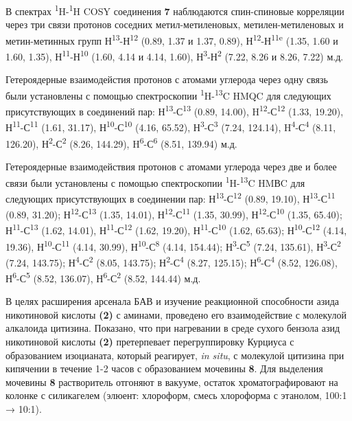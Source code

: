 \begin{multicols}{2}
В спектрах \textsuperscript{1}H-\textsuperscript{1}H COSY соединения
{\bfseries 7} наблюдаются спин-спиновые корреляции через три связи протонов
соседних метил-метиленовых, метилен-метиленовых и метин-метинных групп
Н\textsuperscript{13}-Н\textsuperscript{12} (0.89, 1.37 и 1.37, 0.89),
Н\textsuperscript{12}-Н\textsuperscript{11e} (1.35, 1.60 и 1.60, 1.35),
Н\textsuperscript{11}-Н\textsuperscript{10} (1.60, 4.14 и 4.14, 1.60),
Н\textsuperscript{3}-Н\textsuperscript{2} (7.22, 8.26 и 8.26, 7.22) м.д.

Гетероядерные взаимодейстия протонов с атомами углерода через одну связь
были установлены с помощью спектроскопии
\textsuperscript{1}H-\textsuperscript{13}C HMQC для следующих
присутствующих в соединений пар:
Н\textsuperscript{13}-С\textsuperscript{13} (0.89, 14.00),
H\textsuperscript{12}-С\textsuperscript{12} (1.33, 19.20),
Н\textsuperscript{11}-С\textsuperscript{11} (1.61, 31.17),
Н\textsuperscript{10}-С\textsuperscript{10} (4.16, 65.52),
Н\textsuperscript{3}-С\textsuperscript{3} (7.24, 124.14),
H\textsuperscript{4}-С\textsuperscript{4} (8.11, 126.20),
Н\textsuperscript{2}-С\textsuperscript{2} (8.26, 144.29),
H\textsuperscript{6}-С\textsuperscript{6} (8.51, 139.94) м.д.

Гетероядерные взаимодействия протонов с атомами углерода через две и
более связи были установлены с помощью спектроскопии
\textsuperscript{1}H-\textsuperscript{13}C HMВC для следующих
присутствующих в соединении пар:
Н\textsuperscript{13}-С\textsuperscript{12} (0.89, 19.10),
Н\textsuperscript{13}-С\textsuperscript{11} (0.89, 31.20);
Н\textsuperscript{12}-С\textsuperscript{13} (1.35, 14.01),
Н\textsuperscript{12}-С\textsuperscript{11} (1.35, 30.99),
Н\textsuperscript{12}-С\textsuperscript{10} (1.35, 65.40);
Н\textsuperscript{11}-С\textsuperscript{13} (1.62, 14.01),
Н\textsuperscript{11}-С\textsuperscript{12} (1.62, 19.20),
Н\textsuperscript{11}-С\textsuperscript{10} (1.62, 65.63);
Н\textsuperscript{10}-С\textsuperscript{12} (4.14, 19.36),
Н\textsuperscript{10}-С\textsuperscript{11} (4.14, 30.99),
Н\textsuperscript{10}-С\textsuperscript{8} (4.14, 154.44);
Н\textsuperscript{3}-С\textsuperscript{5} (7.24, 135.61),
Н\textsuperscript{3}-С\textsuperscript{2} (7.24, 143.75);
Н\textsuperscript{4}-С\textsuperscript{2} (8.05, 143.75);
Н\textsuperscript{2}-С\textsuperscript{4} (8.27, 125.15);
Н\textsuperscript{6}-С\textsuperscript{4} (8.52, 126.08),
Н\textsuperscript{6}-С\textsuperscript{5} (8.52, 136.07),
Н\textsuperscript{6}-С\textsuperscript{2} (8.52, 144.44) м.д.

В целях расширения арсенала БАВ и изучение реакционной способности азида
никотиновой кислоты {\bfseries (2)} с аминами, проведено его взаимодействие
с молекулой алкалоида цитизина. Показано, что при нагревании в среде
сухого бензола азид никотиновой кислоты {\bfseries (2)} претерпевает
перегруппировку Курциуса с образованием изоцианата, который реагирует,
\emph{in situ}, с молекулой цитизина при кипячении в течение 1-2 часов с
образованием мочевины {\bfseries 8}. Для выделения мочевины {\bfseries 8}
растворитель отгоняют в вакууме, остаток хроматографировают на колонке с
силикагелем (элюент: хлороформ, смесь хлороформа с этанолом, 100:1 →
10:1).
\end{multicols}

